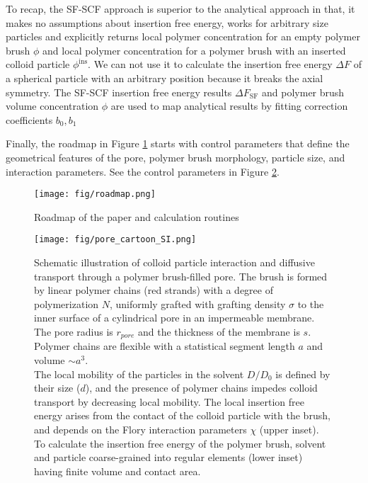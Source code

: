 \documentclass[12pt, a4paper]{article}
\begin{document}
To recap, the SF-SCF approach is superior to the analytical approach in that, it makes no assumptions about insertion free energy, works for arbitrary size particles and explicitly returns local polymer concentration for an empty polymer brush $\phi$ and local polymer concentration for a polymer brush with an inserted colloid particle $\phi^{\textrm{ins}}$.
We can not use it to calculate the insertion free energy $\Delta F$ of a spherical particle with an arbitrary position because it breaks the axial symmetry. 
The SF-SCF insertion free energy results $\Delta F_{\textrm{SF}}$ and polymer brush volume concentration $\phi$ are used to map analytical results by fitting correction coefficients $b_0, b_1$

Finally, the roadmap in Figure \ref{fig:paper_roadmap} starts with control parameters that define the geometrical features of the pore, polymer brush morphology, particle size, and interaction parameters.
See the control parameters in Figure \ref{fig:colloid_transport_SI}.

\begin{figure}
    \centering
    \texttt{[image: fig/roadmap.png]}
    \caption{
        Roadmap of the paper and calculation routines
        }
    \label{fig:paper_roadmap}
\end{figure}


\begin{figure}
    \centering
    \texttt{[image: fig/pore\_cartoon\_SI.png]}
    \caption{
        Schematic illustration of colloid particle interaction and diffusive transport through a polymer brush-filled pore. 
        The brush is formed by linear polymer chains (red strands) with a degree of polymerization $N$, uniformly grafted with grafting density $\sigma$ to the inner surface of a cylindrical pore in an impermeable membrane. 
        The pore radius is $r_{pore}$ and the thickness of the membrane is $s$.
        Polymer chains are flexible with a statistical segment length $a$ and volume $\sim a^3$.
        \\
        The local mobility of the particles in the solvent $D/D_{0}$ is defined by their size ($d$), and the presence of polymer chains impedes colloid transport by decreasing local mobility.
        The local insertion free energy arises from the contact of the colloid particle with the brush, and depends on the Flory interaction parameters $\chi$ (upper inset). 
        \\
        To calculate the insertion free energy of the polymer brush, solvent and particle coarse-grained into regular elements (lower inset) having finite volume and contact area.
        }
        \label{fig:colloid_transport_SI}
    \end{figure}
\end{document}
